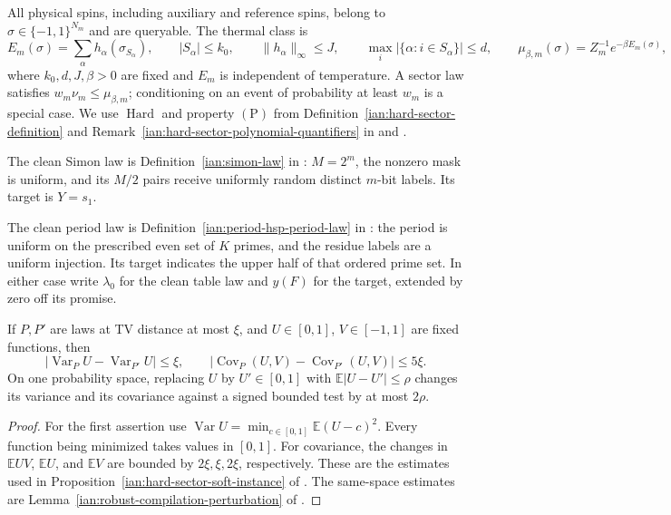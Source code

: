 \begin{definition}
\label{ian:thermal-robust-conventions}
All physical spins, including auxiliary and reference spins, belong to
\(\sigma\in\{-1,1\}^{N_m}\) and are queryable. The thermal class is
\[
 E_m(\sigma)=\sum_\alpha h_\alpha(\sigma_{S_\alpha}),
 \qquad |S_\alpha|\le k_0,\qquad
 \|h_\alpha\|_\infty\le J,\qquad
 \max_i|\{\alpha:i\in S_\alpha\}|\le d,
 \qquad
 \mu_{\beta,m}(\sigma)=Z_m^{-1}e^{-\beta E_m(\sigma)} ,
 \tag{38.1}\label{ian:thermal-robust-physical-bounds}
\]
where \(k_0,d,J,\beta>0\) are fixed and \(E_m\) is independent of
temperature. A sector law satisfies \(w_m\nu_m\le\mu_{\beta,m}\);
conditioning on an event of probability at least \(w_m\) is a special
case. We use \(\operatorname{Hard}\) and property \(\mathrm{(P)}\) from
Definition~\ref{ian:hard-sector-definition} and
Remark~\ref{ian:hard-sector-polynomial-quantifiers} in
 and
.

The clean Simon law is Definition~\ref{ian:simon-law} in
: \(M=2^m\), the nonzero mask is uniform,
and its \(M/2\) pairs receive uniformly random distinct \(m\)-bit
labels. Its target is \(Y=s_1\).

The clean period law is
Definition~\ref{ian:period-hsp-period-law} in
: the period is uniform on the
prescribed even set of \(K\) primes, and the residue labels are a
uniform injection. Its target indicates the upper half of that
ordered prime set. In either case write \(\lambda_0\) for the clean
table law and \(y(F)\) for the target, extended by zero off its promise.
\end{definition}

\begin{lemma}
\label{ian:thermal-robust-tv-estimates}
If \(P,P'\) are laws at TV distance at most \(\xi\), and
\(U\in[0,1]\), \(V\in[-1,1]\) are fixed functions, then
\[
 \left|\operatorname{Var}_{P}U-\operatorname{Var}_{P'}U\right|
 \le\xi,\qquad
 \left|\operatorname{Cov}_{P}(U,V)
       -\operatorname{Cov}_{P'}(U,V)\right|
 \le5\xi.
 \tag{38.2}
\]
On one probability space, replacing \(U\) by \(U'\in[0,1]\) with
\(\mathbb E|U-U'|\le\rho\) changes its variance and its covariance
against a signed bounded test by at most \(2\rho\).
\end{lemma}

\begin{proof}
For the first assertion use
\(\operatorname{Var}U=\min_{c\in[0,1]}\mathbb E(U-c)^2\).
Every function being minimized takes values in \([0,1]\).
For covariance, the changes in
\(\mathbb E UV\), \(\mathbb E U\), and \(\mathbb E V\) are bounded
by \(2\xi,\xi,2\xi\), respectively. These are the estimates used in
Proposition~\ref{ian:hard-sector-soft-instance} of
.
The same-space estimates are
Lemma~\ref{ian:robust-compilation-perturbation} of
.
\end{proof}

